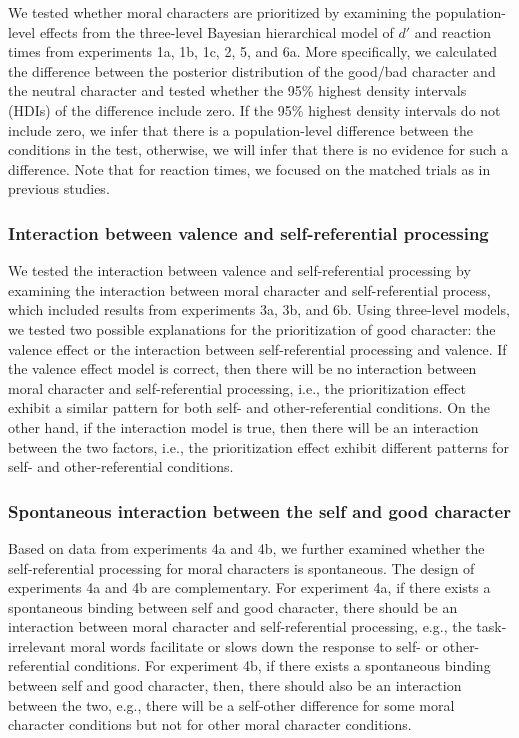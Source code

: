 \documentclass[
  man]{apa6}
\begin{document}
We tested whether moral characters are prioritized by examining the population-level effects from the three-level Bayesian hierarchical model of \(d'\) and reaction times from experiments 1a, 1b, 1c, 2, 5, and 6a. More specifically, we calculated the difference between the posterior distribution of the good/bad character and the neutral character and tested whether the 95\% highest density intervals (HDIs) of the difference include zero. If the 95\% highest density intervals do not include zero, we infer that there is a population-level difference between the conditions in the test, otherwise, we will infer that there is no evidence for such a difference. Note that for reaction times, we focused on the matched trials as in previous studies.

\hypertarget{interaction-between-valence-and-self-referential-processing}{%
\subsubsection{Interaction between valence and self-referential processing}\label{interaction-between-valence-and-self-referential-processing}}

We tested the interaction between valence and self-referential processing by examining the interaction between moral character and self-referential process, which included results from experiments 3a, 3b, and 6b. Using three-level models, we tested two possible explanations for the prioritization of good character: the valence effect or the interaction between self-referential processing and valence. If the valence effect model is correct, then there will be no interaction between moral character and self-referential processing, i.e., the prioritization effect exhibit a similar pattern for both self- and other-referential conditions. On the other hand, if the interaction model is true, then there will be an interaction between the two factors, i.e., the prioritization effect exhibit different patterns for self- and other-referential conditions.

\hypertarget{spontaneous-interaction-between-the-self-and-good-character}{%
\subsubsection{Spontaneous interaction between the self and good character}\label{spontaneous-interaction-between-the-self-and-good-character}}

Based on data from experiments 4a and 4b, we further examined whether the self-referential processing for moral characters is spontaneous. The design of experiments 4a and 4b are complementary. For experiment 4a, if there exists a spontaneous binding between self and good character, there should be an interaction between moral character and self-referential processing, e.g., the task-irrelevant moral words facilitate or slows down the response to self- or other-referential conditions. For experiment 4b, if there exists a spontaneous binding between self and good character, then, there should also be an interaction between the two, e.g., there will be a self-other difference for some moral character conditions but not for other moral character conditions.
\end{document}
